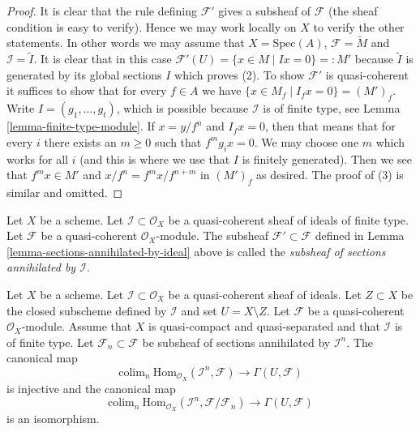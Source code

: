 \begin{proof}
It is clear that the rule defining $\mathcal{F}'$ gives a subsheaf
of $\mathcal{F}$ (the sheaf condition is easy to verify). Hence we
may work locally on $X$ to verify the other statements. In other words
we may assume that $X = \text{Spec}(A)$, $\mathcal{F} = \widetilde{M}$
and $\mathcal{I} = \widetilde{I}$. It is clear that in this case
$\mathcal{F}'(U) = \{x \in M \mid Ix = 0\} =: M'$ because $\widetilde{I}$
is generated by its global sections $I$ which proves (2).
To show $\mathcal{F}'$ is quasi-coherent it suffices to show that
for every $f \in A$ we have
$\{x \in M_f \mid I_f x = 0\} = (M')_f$.
Write $I = (g_1, \ldots, g_t)$, which is possible because $\mathcal{I}$
is of finite type, see Lemma \ref{lemma-finite-type-module}.
If $x = y/f^n$ and $I_fx = 0$, then that means that for every $i$
there exists an $m \geq 0$ such that $f^mg_ix = 0$. 
We may choose one $m$ which works for all $i$ (and this is where we
use that $I$ is finitely generated). Then we see that $f^mx \in M'$
and $x/f^n = f^mx/f^{n + m}$ in $(M')_f$ as desired.
The proof of (3) is similar and omitted.
\end{proof}

\begin{definition}
\label{definition-subsheaf-sections-annihilated-by-ideal}
Let $X$ be a scheme.
Let $\mathcal{I} \subset \mathcal{O}_X$ be a quasi-coherent sheaf of ideals
of finite type.
Let $\mathcal{F}$ be a quasi-coherent $\mathcal{O}_X$-module.
The subsheaf $\mathcal{F}' \subset \mathcal{F}$ defined in
Lemma \ref{lemma-sections-annihilated-by-ideal} above is called
the {\it subsheaf of sections annihilated by $\mathcal{I}$}.
\end{definition}

\begin{lemma}
\label{lemma-sections-over-quasi-compact-open}
Let $X$ be a scheme.
Let $\mathcal{I} \subset \mathcal{O}_X$ be a quasi-coherent sheaf
of ideals. Let $Z \subset X$ be the closed subscheme
defined by $\mathcal{I}$ and set $U = X \setminus Z$.
Let $\mathcal{F}$ be a quasi-coherent $\mathcal{O}_X$-module.
Assume that $X$ is quasi-compact and quasi-separated and
that $\mathcal{I}$ is of finite type.
Let $\mathcal{F}_n \subset \mathcal{F}$
be subsheaf of sections annihilated by $\mathcal{I}^n$.
The canonical map
$$
\text{colim}_n\ \text{Hom}_{\mathcal{O}_X}(\mathcal{I}^n,
\mathcal{F})
\longrightarrow
\Gamma(U, \mathcal{F})
$$
is injective and the canonical map
$$
\text{colim}_n\ \text{Hom}_{\mathcal{O}_X}(\mathcal{I}^n,
\mathcal{F}/\mathcal{F}_n)
\longrightarrow
\Gamma(U, \mathcal{F})
$$
is an isomorphism.
\end{lemma}


